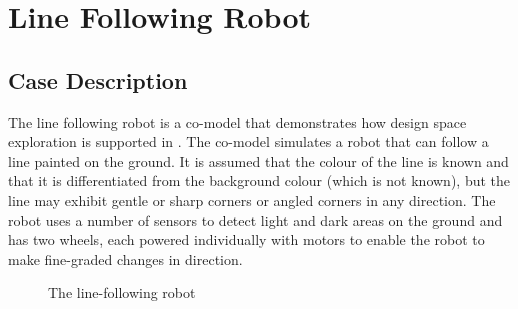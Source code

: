 \chapter{Line Following Robot} \label{chap:lineFollowingRobot}
\section{Case Description} The line following robot is a
co-model that demonstrates how design space exploration is supported
in \DESTECS.  The co-model simulates a robot that can follow a line
painted on the ground. It is assumed that the colour of the line is
known and that it is differentiated from the background colour (which
is not known), but the line may exhibit gentle or sharp corners or
angled corners in any direction. The robot uses a number of sensors to
detect light and dark areas on the ground and has two wheels, each
powered individually with motors to enable the robot to make
fine-graded changes in direction.

\begin{figure}[htb!]
\begin{center}
\caption{The line-following robot}
\label{fig:r2g2p_study}
\end{center}
\end{figure}

